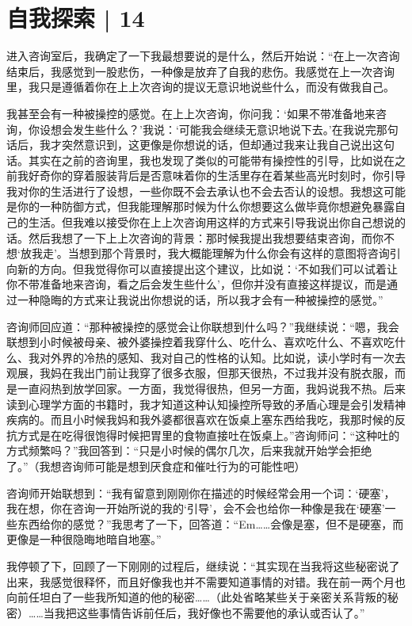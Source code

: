 \chapter{自我探索 | 14}



进入咨询室后，我确定了一下我最想要说的是什么，然后开始说：“在上一次咨询结束后，我感觉到一股悲伤，一种像是放弃了自我的悲伤。我感觉在上一次咨询里，我只是遵循着你在上上次咨询的提议\pozhehao{}无意识地说些什么，而没有做我自己。

我甚至会有一种被操控的感觉。在上上次咨询，你问我：‘如果不带准备地来咨询，你设想会发生些什么？’我说：‘可能我会继续无意识地说下去。’在我说完那句话后，我才突然意识到，这更像是你想说的话，但却通过我来让我自己说出这句话。其实在之前的咨询里，我也发现了类似的可能带有操控性的引导，比如说在之前我好奇你的穿着服装背后是否意味着你的生活里存在着某些高光时刻时，你引导我对你的生活进行了设想，一些你既不会去承认也不会去否认的设想。我想这可能是你的一种防御方式，但我能理解那时候为什么你想要这么做\pozhehao{}毕竟你想避免暴露自己的生活。但我难以接受你在上上次咨询用这样的方式来引导我说出你自己想说的话。然后我想了一下上上次咨询的背景：那时候我提出我想要结束咨询，而你不想‘放我走’。当想到那个背景时，我大概能理解为什么你会有这样的意图\pozhehao{}将咨询引向新的方向。但我觉得你可以直接提出这个建议，比如说：‘不如我们可以试着让你不带准备地来咨询，看之后会发生些什么’，但你并没有直接这样提议，而是通过一种隐晦的方式来让我说出你想说的话，所以我才会有一种被操控的感觉。”

咨询师回应道：“那种被操控的感觉会让你联想到什么吗？”我继续说：“嗯，我会联想到小时候被母亲、被外婆操控着我穿什么、吃什么、喜欢吃什么、不喜欢吃什么、我对外界的冷热的感知、我对自己的性格的认知。比如说，读小学时有一次去观展，我妈在我出门前让我穿了很多衣服，但那天很热，不过我并没有脱衣服，而是一直闷热到放学回家。一方面，我觉得很热，但另一方面，我妈说我不热。后来读到心理学方面的书籍时，我才知道这种认知操控所导致的矛盾心理是会引发精神疾病的。而且小时候我妈和我外婆都很喜欢在饭桌上塞东西给我吃，我那时候的反抗方式是在吃得很饱得时候把胃里的食物直接吐在饭桌上。”咨询师问：“这种吐的方式频繁吗？”我回答到：“只是小时候的偶尔几次，后来我就开始学会拒绝了。”（我想咨询师可能是想到厌食症和催吐行为的可能性吧）

咨询师开始联想到：“我有留意到刚刚你在描述的时候经常会用一个词：‘硬塞’，我在想，你在咨询一开始所说的我的‘引导’，会不会也给你一种像是我在‘硬塞’一些东西给你的感觉？”我思考了一下，回答道：“Em……会像是塞，但不是硬塞，而更像是一种很隐晦地暗自地塞。”

我停顿了下，回顾了一下刚刚的过程后，继续说：“其实现在当我将这些秘密说了出来，我感觉很释怀，而且好像我也并不需要知道事情的对错。我在前一两个月也向前任坦白了一些我所知道的他的秘密……（此处省略某些关于亲密关系背叛的秘密）……当我把这些事情告诉前任后，我好像也不需要他的承认或否认了。”

